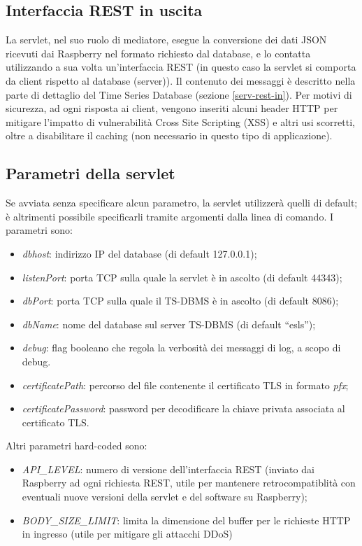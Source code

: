 \subsection{Interfaccia REST in uscita}
La servlet, nel suo ruolo di mediatore, esegue la conversione dei dati JSON ricevuti dai Raspberry nel formato richiesto dal database, e lo contatta utilizzando a sua volta un'interfaccia REST (in questo caso la servlet si comporta da client rispetto al database (server)).
Il contenuto dei messaggi è descritto nella parte di dettaglio del Time Series Database (sezione \ref{serv-rest-in}).
Per motivi di sicurezza, ad ogni risposta ai client, vengono inseriti alcuni header HTTP per mitigare l'impatto di vulnerabilità Cross Site Scripting (XSS) e altri usi scorretti, oltre a disabilitare il caching (non necessario in questo tipo di applicazione).

\subsection{Parametri della servlet}
Se avviata senza specificare alcun parametro, la servlet utilizzerà quelli di default; è altrimenti possibile specificarli tramite argomenti dalla linea di comando. I parametri sono:
\begin{itemize}
 \item \textit{dbhost}: indirizzo IP del database (di default 127.0.0.1);
 \item \textit{listenPort}: porta TCP sulla quale la servlet è in ascolto (di default 44343);
 \item \textit{dbPort}: porta TCP sulla quale il TS-DBMS è in ascolto (di default 8086);
 \item \textit{dbName}: nome del database sul server TS-DBMS (di default ``esls'');
 \item \textit{debug}: flag booleano che regola la verbosità dei messaggi di log, a scopo di debug.
 \item \textit{certificatePath}: percorso del file contenente il certificato TLS in formato \textit{pfx};
 \item \textit{certificatePassword}: password per decodificare la chiave privata associata al certificato TLS.
\end{itemize}
Altri parametri hard-coded sono:
\begin{itemize}
 \item \textit{API\_LEVEL}: numero di versione dell'interfaccia REST (inviato dai Raspberry ad ogni richiesta REST, utile per mantenere retrocompatiblità con eventuali nuove versioni della servlet e del software su Raspberry);
 \item \textit{BODY\_SIZE\_LIMIT}: limita la dimensione del buffer per le richieste HTTP in ingresso (utile per mitigare gli attacchi DDoS)
\end{itemize}


